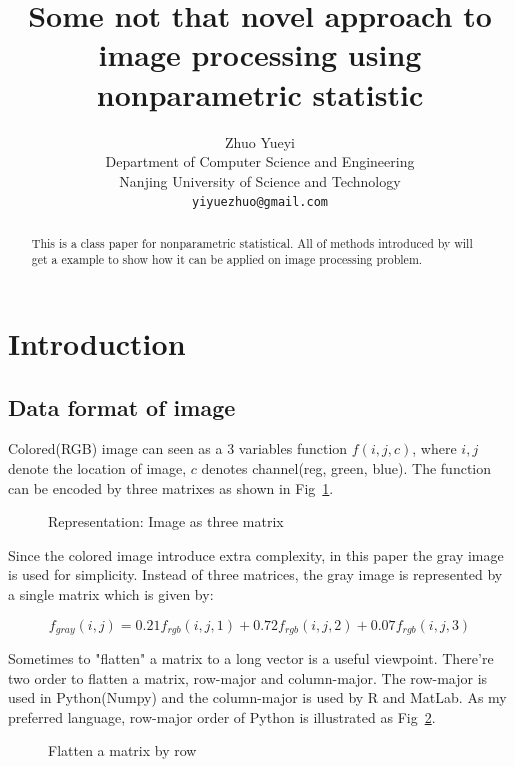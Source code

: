 \documentclass{article}
\title{Some not that novel approach to image processing using nonparametric statistic}
\author{
  Zhuo Yueyi \\ %
  Department of Computer Science and Engineering\\
  Nanjing University of Science and Technology\\
  \texttt{yiyuezhuo@gmail.com} \\
}
\begin{document}
\maketitle

\begin{abstract}
This is a class paper for nonparametric statistical. 
All of methods introduced by \cite{wasserman2006all} will get a example to show how it can be applied on
image processing problem.
\end{abstract}




\section{Introduction}




\subsection{Data format of image}

Colored(RGB) image can seen as a 3 variables function  $f(i,j,c)$, where $i,j$ denote the location of image, $c$ denotes
channel(reg, green, blue). The function can be encoded by three matrixes as shown in Fig~\ref{fig:toad_rgb}.

\begin{figure}[htb]
  \centering
  
  \caption{Representation: Image as three matrix}
  \label{fig:toad_rgb}
\end{figure}

Since the colored image introduce extra complexity, in this paper the gray image is used for simplicity.
Instead of three matrices, the gray image is represented by a single matrix which is given by:

$$
f_{gray}(i,j) = 0.21 f_{rgb}(i,j,1) + 0.72 f_{rgb}(i,j,2) + 0.07 f_{rgb}(i,j,3)
$$

Sometimes to "flatten" a matrix to a long vector is a useful viewpoint. There're two order to flatten a matrix,
row-major and column-major. The row-major is used in Python(Numpy) and the column-major is used by R and MatLab.
As my preferred language, row-major order of Python is illustrated as Fig~\ref{fig:flatten_matrix}.

\begin{figure}[htb]
  \centering
  
  \caption{Flatten a matrix by row}
  \label{fig:flatten_matrix}
\end{figure}
\end{document}
